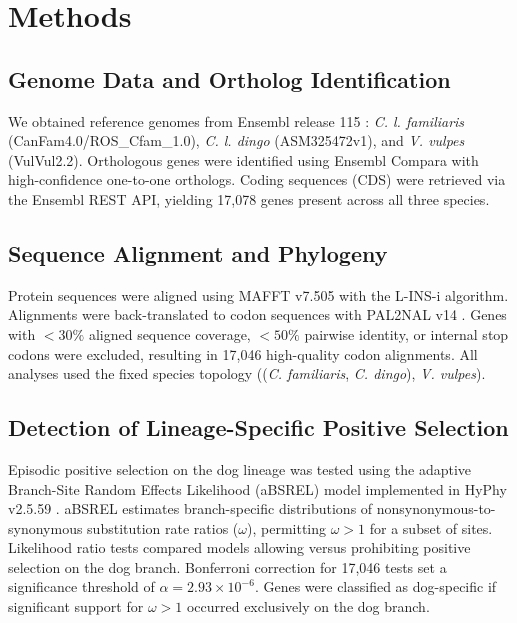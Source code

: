 \documentclass[11pt,letterpaper]{article}
\begin{document}
\section{Methods}

\subsection{Genome Data and Ortholog Identification}

We obtained reference genomes from Ensembl release 115 \citep{Yates2022}: \textit{C. l. familiaris} (CanFam4.0/ROS\_Cfam\_1.0), \textit{C. l. dingo} (ASM325472v1), and \textit{V. vulpes} (VulVul2.2). Orthologous genes were identified using Ensembl Compara \citep{Herrero2016} with high-confidence one-to-one orthologs. Coding sequences (CDS) were retrieved via the Ensembl REST API, yielding 17,078 genes present across all three species.

\subsection{Sequence Alignment and Phylogeny}

Protein sequences were aligned using MAFFT v7.505 \citep{Katoh2013} with the L-INS-i algorithm. Alignments were back-translated to codon sequences with PAL2NAL v14 \citep{Suyama2006}. Genes with $<30\%$ aligned sequence coverage, $<50\%$ pairwise identity, or internal stop codons were excluded, resulting in 17,046 high-quality codon alignments. All analyses used the fixed species topology ((\textit{C. familiaris}, \textit{C. dingo}), \textit{V. vulpes}).

\subsection{Detection of Lineage-Specific Positive Selection}
Episodic positive selection on the dog lineage was tested using the adaptive Branch-Site Random Effects Likelihood (aBSREL) model \citep{Smith2015} implemented in HyPhy v2.5.59 \citep{Kosakovsky2020}. aBSREL estimates branch-specific distributions of nonsynonymous-to-synonymous substitution rate ratios ($\omega$), permitting $\omega > 1$ for a subset of sites. Likelihood ratio tests compared models allowing versus prohibiting positive selection on the dog branch. Bonferroni correction for 17{,}046 tests set a significance threshold of $\alpha = 2.93 \times 10^{-6}$. Genes were classified as dog-specific if significant support for $\omega>1$ occurred exclusively on the dog branch.
\end{document}
